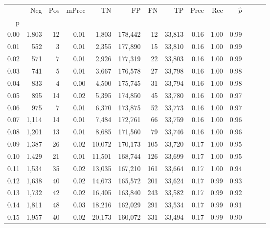 \begin{tabular}{rrrrrrrrrrrrrr}
\toprule
{} &    Neg &  Pos & mPrec &       TN &       FP &      FN &      TP &  Prec &   Rec & $\hat{p}$ \\
p    &        &      &       &          &          &         &         &       &       &           \\
\midrule
0.00 &  1,803 &   12 &  0.01 &    1,803 &  178,442 &      12 &  33,813 &  0.16 &  1.00 &      0.99 \\
0.01 &    552 &    3 &  0.01 &    2,355 &  177,890 &      15 &  33,810 &  0.16 &  1.00 &      0.99 \\
0.02 &    571 &    7 &  0.01 &    2,926 &  177,319 &      22 &  33,803 &  0.16 &  1.00 &      0.99 \\
0.03 &    741 &    5 &  0.01 &    3,667 &  176,578 &      27 &  33,798 &  0.16 &  1.00 &      0.98 \\
0.04 &    833 &    4 &  0.00 &    4,500 &  175,745 &      31 &  33,794 &  0.16 &  1.00 &      0.98 \\
0.05 &    895 &   14 &  0.02 &    5,395 &  174,850 &      45 &  33,780 &  0.16 &  1.00 &      0.97 \\
0.06 &    975 &    7 &  0.01 &    6,370 &  173,875 &      52 &  33,773 &  0.16 &  1.00 &      0.97 \\
0.07 &  1,114 &   14 &  0.01 &    7,484 &  172,761 &      66 &  33,759 &  0.16 &  1.00 &      0.96 \\
0.08 &  1,201 &   13 &  0.01 &    8,685 &  171,560 &      79 &  33,746 &  0.16 &  1.00 &      0.96 \\
0.09 &  1,387 &   26 &  0.02 &   10,072 &  170,173 &     105 &  33,720 &  0.17 &  1.00 &      0.95 \\
0.10 &  1,429 &   21 &  0.01 &   11,501 &  168,744 &     126 &  33,699 &  0.17 &  1.00 &      0.95 \\
0.11 &  1,534 &   35 &  0.02 &   13,035 &  167,210 &     161 &  33,664 &  0.17 &  1.00 &      0.94 \\
0.12 &  1,638 &   40 &  0.02 &   14,673 &  165,572 &     201 &  33,624 &  0.17 &  0.99 &      0.93 \\
0.13 &  1,732 &   42 &  0.02 &   16,405 &  163,840 &     243 &  33,582 &  0.17 &  0.99 &      0.92 \\
0.14 &  1,811 &   48 &  0.03 &   18,216 &  162,029 &     291 &  33,534 &  0.17 &  0.99 &      0.91 \\
0.15 &  1,957 &   40 &  0.02 &   20,173 &  160,072 &     331 &  33,494 &  0.17 &  0.99 &      0.90 \\

\end{tabular}
